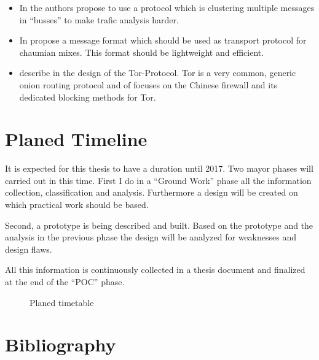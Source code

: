 \documentclass[twocolumn,a4paper,10pt,english]{scrartcl}
\begin{document}
\begin{itemize}
\item In \cite{buses03} the authors \citeauthor{buses03} propose to use a protocol which is clustering multiple messages in ``busses'' to make trafic analysis harder.
\item In \cite{danezis:wpes2004} \citeauthor{danezis:wpes2004} propose a message format which should be used as transport protocol for chaumian mixes. This format should be lightweight and efficient.
\item \citeauthor{tor-design} describe in \cite{tor-design} the design of the Tor-Protocol. Tor is a very common, generic onion routing protocol and \cite{foci12-winter} of \citeauthor{foci12-winter} focuses on the Chinese firewall and its dedicated blocking methods for Tor.
\end{itemize}

\section{Planed Timeline}
It is expected for this thesis to have a duration until 2017. Two mayor phases will carried out in this time. First I do in a ``Ground Work'' phase all the information collection, classification and analysis. Furthermore a design will be created on which practical work should be based.\par

Second, a prototype is being described and built. Based on the prototype and the analysis in the previous phase the design will be analyzed for weaknesses and design flaws.\par
All this information is continuously collected in a thesis document and finalized at the end of the ``POC'' phase.\par
\begin{figure}[H]%
\caption{Planed timetable}%
\label{Gant chart}%
\end{figure}

\section{Bibliography}
\printbibliography[title={},heading=none]
\end{document}
